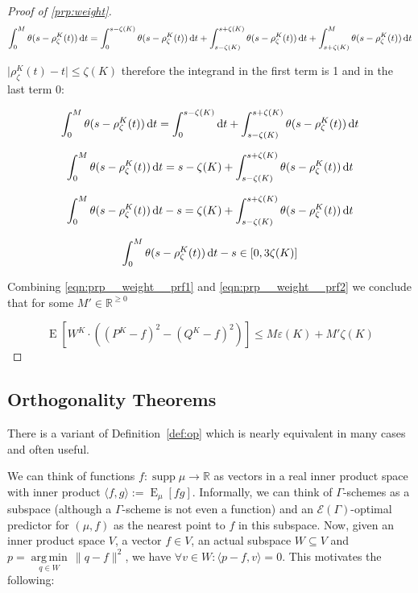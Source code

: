 \documentclass{article}
\numberwithin{equation}{section}
\theoremstyle{definition}
\theoremstyle{plain}
\DeclareMathOperator{\Supp}{supp}
\DeclareMathOperator{\E}{E}
\newcommand{\Argmin}[1]{\underset{#1}{\operatorname{arg\,min}}\,}
\newcommand{\Reals}{\mathbb{R}}
\newcommand{\Abs}[1]{\lvert #1 \rvert}
\newcommand{\Norm}[1]{\lVert #1 \rVert}
\newcommand{\Chev}[1]{\langle #1 \rangle}
\newcommand{\Fall}{\mathcal{E}}
\newcommand{\EG}{\Fall(\Gamma)}
\begin{document}
\begin{proof}[Proof of \ref{prp:weight}]
$$\int_0^M \theta(s-\rho_\zeta^{K}(t)) \dif t = \int_0^{s-\zeta(K)} \theta(s-\rho_\zeta^{K}(t)) \dif t + \int_{s-\zeta(K)}^{s+\zeta(K)} \theta(s-\rho_\zeta^{K}(t)) \dif t + \int_{s+\zeta(K)}^M \theta(s-\rho_\zeta^{K}(t)) \dif t$$

$\Abs{\rho_\zeta^{K}(t)-t} \leq \zeta(K)$ therefore the integrand in the first term is 1 and in the last term 0:

$$\int_0^M \theta(s-\rho_\zeta^{K}(t)) \dif t = \int_0^{s-\zeta(K)} \dif t + \int_{s-\zeta(K)}^{s+\zeta(K)} \theta(s-\rho_\zeta^{K}(t)) \dif t$$

$$\int_0^M \theta(s-\rho_\zeta^{K}(t)) \dif t = s-\zeta(K) + \int_{s-\zeta(K)}^{s+\zeta(K)} \theta(s-\rho_\zeta^{K}(t)) \dif t$$

$$\int_0^M \theta(s-\rho_\zeta^{K}(t)) \dif t - s = \zeta(K) + \int_{s-\zeta(K)}^{s+\zeta(K)} \theta(s-\rho_\zeta^{K}(t)) \dif t$$

\begin{equation}
\label{eqn:prp__weight__prf2}
\int_0^M \theta(s-\rho_\zeta^{K}(t)) \dif t - s \in [0,3\zeta(K)]
\end{equation}

Combining \ref{eqn:prp__weight__prf1} and \ref{eqn:prp__weight__prf2} we conclude that for some $M' \in \Reals^{\geq 0}$

$$\E[W^{K} \cdot ((P^{K}-f)^2-(Q^{K}-f)^2)] \leq M \varepsilon(K) + M'\zeta(K)$$
\end{proof}

\subsection{Orthogonality Theorems}

There is a variant of Definition~\ref{def:op} which is nearly equivalent in many cases and often useful.

We can think of functions $f: \Supp \mu \rightarrow \Reals$ as vectors in a real inner product space with inner product $\Chev{f,g}:=\E_\mu[fg]$. Informally, we can think of $\Gamma$-schemes as a subspace (although a $\Gamma$-scheme is not even a function) and an $\EG$-optimal predictor for $(\mu,f)$ as the nearest point to $f$ in this subspace. Now, given an inner product space $V$, a vector $f \in V$, an actual subspace $W \subseteq V$ and $p = \Argmin{q \in W} \Norm{q - f}^2$, we have $\forall v \in W: \Chev{p-f,v}=0$. This motivates the following:
\end{document}
